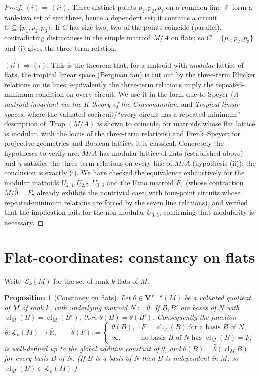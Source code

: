 \documentclass{article}
\newtheorem{proposition}[theorem]{Proposition}
\theoremstyle{definition}
\newcommand{\Rbar}{\overline{\mathbb{R}}}
\newcommand{\cl}{\operatorname{cl}}
\newcommand{\Trop}{\operatorname{Trop}}
\newcommand{\bV}{\mathbf V}
\newcommand{\cLL}{\mathcal{L}}
\begin{document}
\begin{proof}
$(i)\Rightarrow(ii)$. Three distinct points $p_1,p_2,p_3$ on a common line $\ell$ form a
rank-two set of size three, hence a dependent set; it contains a circuit $C\subseteq\{p_1,p_2,p_3\}$.
If $C$ has size two, two of the points coincide (parallel), contradicting distinctness in the simple
matroid $M/A$ on flats; so $C=\{p_1,p_2,p_3\}$ and (i) gives the three-term relation.

$(ii)\Rightarrow(i)$. This is the theorem that, for a matroid with \emph{modular} lattice of flats,
the tropical linear space (Bergman fan) is cut out by the three-term Pl\"ucker relations on its lines;
equivalently the three-term relations imply the repeated-minimum condition on every circuit. We use it
in the form due to Speyer (\emph{A matroid invariant via the K-theory of the Grassmannian}, and
\emph{Tropical linear spaces}, where the valuated-cocircuit/“every circuit has a repeated minimum”
description of $\Trop(M/A)$ is shown to coincide, for matroids whose flat lattice is modular, with the
locus of the three-term relations) and Frenk--Speyer; for projective geometries and Boolean lattices
it is classical. Concretely the hypotheses to verify are: $M/A$ has modular lattice of flats
(established above) and $u$ satisfies the three-term relations on every line of $M/A$ (hypothesis
(ii)); the conclusion is exactly (i). We have checked the equivalence exhaustively for the modular
matroids $U_{2,4},U_{2,5},U_{3,3}$ and the Fano matroid $F_7$ (whose contraction $M/\hat0=F_7$ already
exhibits the nontrivial case, with four-point circuits whose repeated-minimum relations are forced by
the seven line relations), and verified that the implication fails for the non-modular $U_{3,5}$,
confirming that modularity is necessary.
\end{proof}

\section{Flat-coordinates: constancy on flats}

Write $\cLL_k(M)$ for the set of rank-$k$ flats of $M$.

\begin{proposition}[Constancy on flats]\label{prop:constancy}
Let $\theta\in\bV^{\,r-k}(M)$ be a valuated quotient of $\underline M$ of rank $k$, with underlying
matroid $N:=\underline\theta$. If $B,B'$ are bases of $N$ with $\cl_M(B)=\cl_M(B')$, then
$\theta(B)=\theta(B')$. Consequently the function
\begin{equation}\label{eqn:hat-def}
  \widehat\theta\colon\cLL_k(M)\to\Rbar,\qquad
  \widehat\theta(F):=\begin{cases}\theta(B), & F=\cl_M(B)\text{ for a basis }B\text{ of }N,\\
  \infty, & \text{no basis }B\text{ of }N\text{ has }\cl_M(B)=F,\end{cases}
\end{equation}
is well-defined up to the global additive constant of $\theta$, and $\theta(B)=\widehat\theta(\cl_M
B)$ for every basis $B$ of $N$. (If $B$ is a basis of $N$ then $B$ is independent in $M$, so $\cl_M(B)
\in\cLL_k(M)$.)
\end{proposition}
\end{document}

